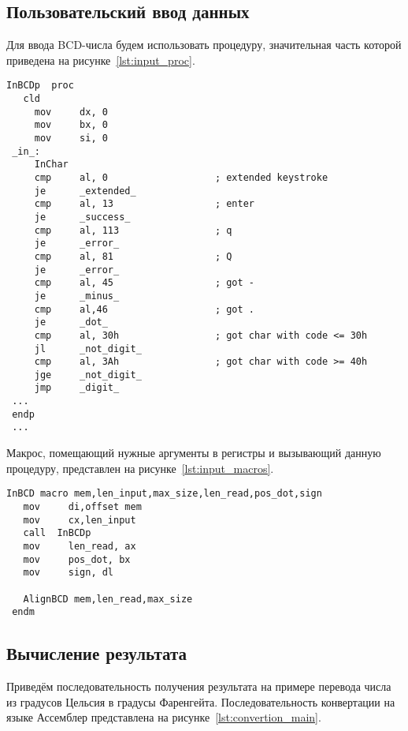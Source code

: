 \subsection{Пользовательский ввод данных}

Для ввода BCD-числа будем использовать процедуру, значительная часть которой
приведена на рисунке~\ref{lst:input_proc}.

\begin{lstlisting}[caption={Процедура обработки пользователького ввода данных},
label=lst:input_proc,language={[x86masm]Assembler},basicstyle=\scriptsize\ttfamily]
 InBCDp  proc
   cld
     mov     dx, 0
     mov     bx, 0
     mov     si, 0
 _in_:
     InChar
     cmp     al, 0                   ; extended keystroke
     je      _extended_
     cmp     al, 13                  ; enter
     je      _success_
     cmp     al, 113                 ; q
     je      _error_
     cmp     al, 81                  ; Q
     je      _error_
     cmp     al, 45                  ; got -
     je      _minus_
     cmp     al,46                   ; got .
     je      _dot_
     cmp     al, 30h                 ; got char with code <= 30h
     jl      _not_digit_
     cmp     al, 3Ah                 ; got char with code >= 40h
     jge     _not_digit_
     jmp     _digit_
 ...
 endp
 ...
\end{lstlisting}

Макрос, помещающий нужные аргументы в регистры и вызывающий данную процедуру,
представлен на рисунке~\ref{lst:input_macros}.

\begin{lstlisting}[caption={Макрос обработки пользовательского ввода},
label=lst:input_macros,language={[x86masm]Assembler},basicstyle=\scriptsize\ttfamily]
 InBCD macro mem,len_input,max_size,len_read,pos_dot,sign
   mov     di,offset mem
   mov     cx,len_input
   call  InBCDp
   mov     len_read, ax
   mov     pos_dot, bx
   mov     sign, dl

   AlignBCD mem,len_read,max_size
 endm
\end{lstlisting}

\subsection{Вычисление результата}

Приведём последовательность получения результата на примере перевода числа из
градусов Цельсия в градусы Фаренгейта. Последовательность конвертации на языке 
Ассемблер представлена на рисунке~\ref{lst:convertion_main}.

